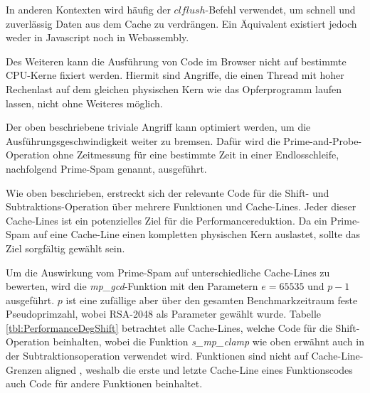 In anderen Kontexten wird häufig der $clflush$-Befehl verwendet, um schnell und zuverlässig Daten aus dem Cache zu verdrängen. 
Ein Äquivalent existiert jedoch weder in Javascript noch in Webassembly.

Des Weiteren kann die Ausführung von Code im Browser nicht auf bestimmte CPU-Kerne fixiert werden. Hiermit sind Angriffe, die einen Thread mit hoher Rechenlast auf dem gleichen physischen Kern wie das Opferprogramm laufen lassen, nicht ohne Weiteres möglich.

Der oben beschriebene triviale Angriff kann optimiert werden, um die Ausführungsgeschwindigkeit weiter zu bremsen. 
Dafür wird die Prime-and-Probe-Operation ohne Zeitmessung für eine bestimmte Zeit in einer Endlosschleife, nachfolgend Prime-Spam genannt, ausgeführt.

Wie oben beschrieben, erstreckt sich der relevante Code für die Shift- und Subtraktions-Operation über mehrere Funktionen und Cache-Lines.
Jeder dieser Cache-Lines ist ein potenzielles Ziel für die Performancereduktion.
Da ein Prime-Spam auf eine Cache-Line einen kompletten physischen Kern auslastet, sollte das Ziel sorgfältig gewählt sein.

Um die Auswirkung vom Prime-Spam auf unterschiedliche Cache-Lines zu bewerten, wird die \textit{mp_gcd}-Funktion mit den Parametern $e=65535$ und $p-1$ ausgeführt.
$p$ ist eine zufällige aber über den gesamten Benchmarkzeitraum feste Pseudoprimzahl, wobei RSA-2048 als Parameter gewählt wurde.
Tabelle \ref{tbl:PerformanceDegShift} betrachtet alle Cache-Lines, welche Code für die Shift-Operation beinhalten, wobei die Funktion \textit{s_mp_clamp} wie oben erwähnt auch in der Subtraktionsoperation verwendet wird.
Funktionen sind nicht auf Cache-Line-Grenzen aligned
, weshalb die erste und letzte Cache-Line eines Funktionscodes auch Code für andere Funktionen beinhaltet.

